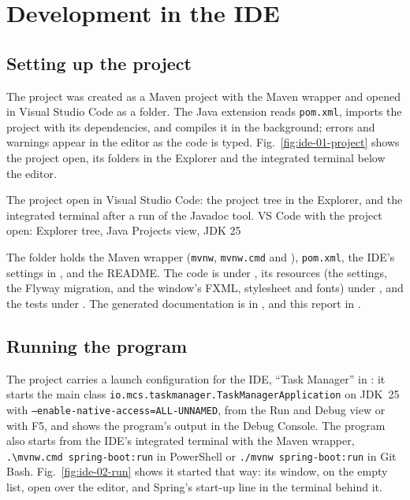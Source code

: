 \section{Development in the IDE}\label{sec:ide}

\subsection{Setting up the project}

The project was created as a Maven project with the Maven wrapper and opened in Visual Studio Code as a folder. The
Java extension reads \texttt{pom.xml}, imports the project with its dependencies, and compiles it in the background;
errors and warnings appear in the editor as the code is typed. Fig.~\ref{fig:ide-01-project} shows the project open,
its folders in the Explorer and the integrated terminal below the editor.

  {The project open in Visual Studio Code: the project tree in the Explorer, and the integrated terminal after a run of
   the Javadoc tool.}
  {VS Code with the project open: Explorer tree, Java Projects view, JDK 25}

The folder holds the Maven wrapper (\texttt{mvnw}, \texttt{mvnw.cmd} and ), \texttt{pom.xml}, the
IDE's settings in , and the README. The code is under , its resources (the
settings, the Flyway migration, and the window's FXML, stylesheet and fonts) under , and the
tests under . The generated documentation is in , and this report in
.

\subsection{Running the program}

The project carries a launch configuration for the IDE, ``Task Manager'' in : it starts
the main class \texttt{io.mcs.taskmanager.TaskManagerApplication} on JDK~25 with
\texttt{--enable-native-access=ALL-UNNAMED}, from the Run and Debug view or with F5, and shows the program's output in
the Debug Console. The program also starts from the IDE's integrated terminal with the Maven wrapper,
\texttt{.\textbackslash{}mvnw.cmd spring-boot:run} in PowerShell or \texttt{./mvnw spring-boot:run} in Git Bash.
Fig.~\ref{fig:ide-02-run} shows it started that way: its window, on the empty list, open over the editor, and
Spring's start-up line in the terminal behind it.


